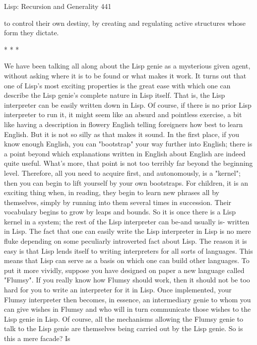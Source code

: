 Lisp: Recursion and Generality                                                       441

to control their own destiny, by creating and regulating active structures whose form
they dictate.

                                        *   *   *

        We have been talking all along about the Lisp genie as a mysterious given
agent, without asking where it is to be found or what makes it work. It turns out that
one of Lisp's most exciting properties is the great ease with which one can describe
the Lisp genie's complete nature in Lisp itself. That is, the Lisp interpreter can be
easily written down in Lisp. Of course, if there is no prior Lisp interpreter to run it, it
might seem like an absurd and pointless exercise, a bit like having a description in
flowery English telling foreigners how best to learn English. But it is not so silly as
that makes it sound.
        In the first place, if you know enough English, you can "bootstrap" your way
further into English; there is a point beyond which explanations written in English
about English are indeed quite useful. What's more, that point is not too terribly far
beyond the beginning level. Therefore, all you need to acquire first, and
autonomously, is a "kernel"; then you can begin to lift yourself by your own
bootstraps. For children, it is an exciting thing when, in reading, they begin to learn
new phrases all by themselves, simply by running into them several times in
succession. Their vocabulary begins to grow by leaps and bounds. So it is once there
is a Lisp kernel in a system; the rest of the Lisp interpreter can be-and usually is-
written in Lisp.
        The fact that one can easily write the Lisp interpreter in Lisp is no mere fluke
depending on some peculiarly introverted fact about Lisp. The reason it is easy is that
Lisp lends itself to writing interpreters for all sorts of languages. This means that Lisp
can serve as a basis on which one can build other languages.
        To put it more vividly, suppose you have designed on paper a new language
called "Flumsy". If you really know how Flumsy should work, then it should not be
too hard for you to write an interpreter for it in Lisp. Once implemented, your Flumsy
interpreter then becomes, in essence, an intermediary genie to whom you can give
wishes in Flumsy and who will in turn communicate those wishes to the Lisp genie in
Lisp. Of course, all the mechanisms allowing the Flumsy genie to talk to the Lisp
genie are themselves being carried out by the Lisp genie. So is this a mere facade? Is
